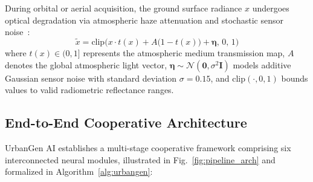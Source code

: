 \documentclass[journal]{IEEEtran}
\begin{document}
During orbital or aerial acquisition, the ground surface radiance $x$ undergoes optical degradation via atmospheric haze attenuation and stochastic sensor noise~\cite{vincent2008extracting,zhang2017beyond}:
\begin{equation}
\tilde{x} = \text{clip}\Big(x \cdot t(x) + A\big(1 - t(x)\big) + \bm{\eta},\, 0,\, 1\Big)
\label{eq:degradation}
\end{equation}
where $t(x) \in (0, 1]$ represents the atmospheric medium transmission map, $A$ denotes the global atmospheric light vector, $\bm{\eta} \sim \mathcal{N}(\mathbf{0}, \sigma^2 \mathbf{I})$ models additive Gaussian sensor noise with standard deviation $\sigma = 0.15$, and $\text{clip}(\cdot, 0, 1)$ bounds values to valid radiometric reflectance ranges.

\subsection{End-to-End Cooperative Architecture}
UrbanGen AI establishes a multi-stage cooperative framework comprising six interconnected neural modules, illustrated in Fig.~\ref{fig:pipeline_arch} and formalized in Algorithm~\ref{alg:urbangen}:
\end{document}

